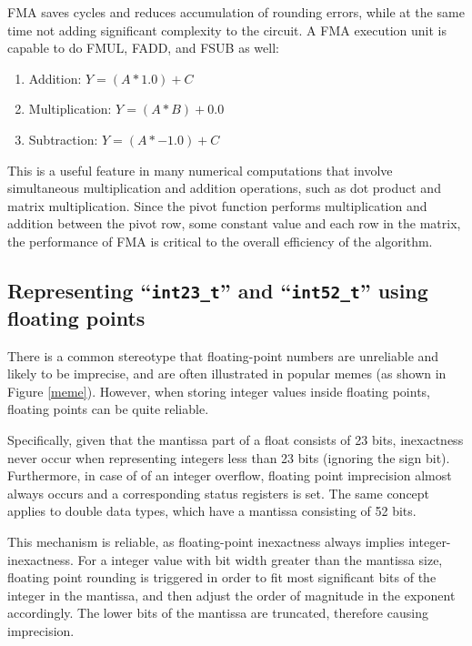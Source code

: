 \documentclass[logo,bsc,singlespacing,parskip]{infthesis}
\newenvironment{compactlist}
{ \begin{enumerate}
    \setlength{\itemsep}{0pt}
    \setlength{\parskip}{0pt}
    \setlength{\parsep}{0pt}     
}
{ \end{enumerate} }
\begin{document}
FMA saves cycles and reduces accumulation of rounding errors, while at the same
time not adding significant complexity to the circuit. A FMA execution unit is
capable to do FMUL, FADD, and FSUB as well: 
\begin{compactlist} 
\item[] Addition: \begin{math}Y = (A * 1.0) + C \end{math} 
\item[] Multiplication: \begin{math} Y = (A * B) + 0.0 \end{math} 
\item[] Subtraction: \begin{math} Y = (A * -1.0) + C\end{math} 
\end{compactlist} 

This is a useful feature in many numerical computations that involve
simultaneous multiplication and addition operations, such as dot product and
matrix multiplication. Since the pivot function performs multiplication and
addition between the pivot row, some constant value and each row in the matrix,
the performance of FMA is critical to the overall efficiency of the algorithm. 

\subsection{Representing ``\texttt{int23\_t}'' and ``\texttt{int52\_t}'' using
floating points}
\label{sec:fpe2}

There is a common stereotype that floating-point numbers are unreliable and
likely to be imprecise, and are often illustrated in popular memes (as shown in
Figure \ref{meme}). However, when storing integer values inside floating points, 
floating points can be quite reliable. 

Specifically, given that the mantissa part of a float consists of 23 bits,
inexactness never occur when representing integers less than 23 bits (ignoring
the sign bit). Furthermore, in case of of an integer overflow, floating point
imprecision almost always occurs and a corresponding status registers is set.
The same concept applies to double data types, which have a mantissa consisting
of 52 bits.

This mechanism is reliable, as floating-point inexactness always implies
integer-inexactness. For a integer value with bit width greater than the
mantissa size, floating point rounding is triggered in order to fit most
significant bits of the integer in the mantissa, and then adjust the order of
magnitude in the exponent accordingly. The lower bits of the mantissa are
truncated, therefore causing imprecision. 
\end{document}
